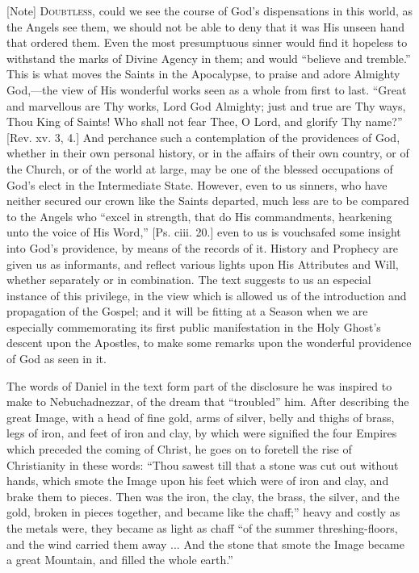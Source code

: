 [Note] D\textsc{oubtless}, could we see the
course of God's dispensations in this world, as the Angels see them, we
should not be able to deny that it was His unseen hand that ordered
them. Even the most presumptuous sinner would find it hopeless to
withstand the marks of Divine Agency in them; and would ``believe and
tremble.'' This is what moves the Saints in the Apocalypse, to
praise and adore Almighty God,—the view of His wonderful works seen as
a whole from first to last. ``Great and marvellous are Thy works,
Lord God Almighty; just and true are Thy ways, Thou King of Saints! Who
shall not fear Thee, O Lord, and glorify Thy name?'' [Rev. xv. 3,
4.] And perchance such a contemplation of the providences of God,
whether in their own personal history, or in the affairs of their own
country, or of the Church, or of the world at large, may be one of the
blessed occupations of God's elect in the Intermediate State. However,
even to us sinners, who have neither secured our crown like the Saints
departed, much less are to be compared to the Angels who ``excel in
strength, that do His commandments, hearkening unto the voice of His
Word,'' [Ps. ciii. 20.] even to us is vouchsafed some insight into
God's providence, by means of the records of it. History and Prophecy
are given us as informants, and reflect various lights upon His
Attributes and Will, whether separately or in combination. The text
suggests to us an especial instance of this privilege, in the view which
is allowed us of the introduction and propagation of the Gospel; and it
will be fitting at a Season when we are especially commemorating its
first public manifestation in the Holy Ghost's descent upon the
Apostles, to make some remarks upon the wonderful providence of God as
seen in it.

The words of Daniel in the text form part of the disclosure he was
inspired to make to Nebuchadnezzar, of the dream that
``troubled'' him. After describing the great Image, with a head
of fine gold, arms of silver, belly and thighs of brass, legs of iron,
and feet of iron and clay, by which were signified the four Empires
which preceded the coming of Christ, he goes on to foretell the rise of
Christianity in these words: ``Thou sawest till that a stone was cut
out without hands, which smote the Image upon his feet which were of
iron and clay, and brake them to pieces. Then was the iron, the clay,
the brass, the silver, and the gold, broken in pieces together, and
became like the chaff;'' heavy and costly as the metals were, they became
as light as chaff ``of the summer threshing-floors, and the wind
carried them away ... And the stone that smote the Image became a great
Mountain, and filled the whole earth.''

